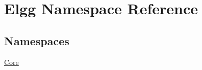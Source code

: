 \hypertarget{namespace_elgg}{}\section{Elgg Namespace Reference}
\label{namespace_elgg}
\subsection*{Namespaces}
\begin{DoxyCompactItemize}
\item 
 \hyperlink{namespace_elgg_1_1_core}{Core}
\end{DoxyCompactItemize}
